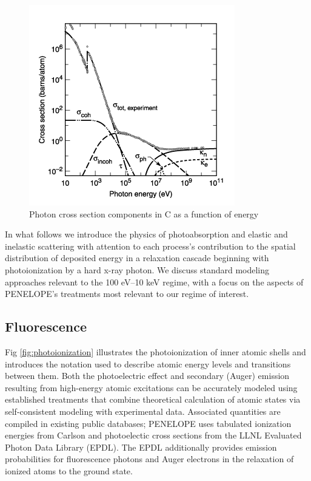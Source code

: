 \documentclass [11pt, proquest, article] {uwthesis}[2016/11/22]
\begin{document}
\begin{figure}[h] 
\caption{Photon cross section components in C as a function of energy \cite{hubbell1980pair}}
\label{fig:photon_sigma}
\centering
\includegraphics[scale=1]{../Figures/photon_sigma.png}
\end{figure}

In what follows we introduce the physics of photoabsorption and elastic and inelastic scattering with attention to each process's contribution to the spatial distribution of deposited energy in a relaxation cascade beginning with photoionization by a hard x-ray photon. We discuss standard modeling approaches relevant to the 100 eV--10 keV regime, with a focus on the aspects of PENELOPE's treatments most relevant to our regime of interest. %

\subsection{Fluorescence}
Fig \ref{fig:photoionization} illustrates the photoionization of inner atomic shells and introduces the notation used to describe atomic energy levels and transitions between them.
Both the photoelectric effect and secondary (Auger) emission resulting from high-energy atomic excitations can be accurately modeled using established treatments that combine theoretical calculation of atomic states via self-consistent modeling with experimental data.\cite{pratt1973atomic} Associated quantities are compiled in existing public databases; PENELOPE uses tabulated ionization energies from Carlson  and photoelectic cross sections from the LLNL Evaluated Photon Data Library (EPDL). The EPDL additionally provides emission probabilities for fluorescence photons and Auger electrons in the relaxation of ionized atoms to the ground state.
\end{document}

